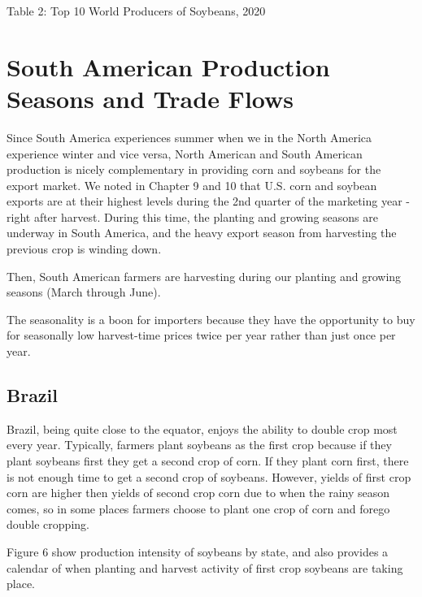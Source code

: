 \documentclass[
]{book}
\begin{document}
Table 2: Top 10 World Producers of Soybeans, 2020

\hypertarget{south-american-production-seasons-and-trade-flows}{%
\section{South American Production Seasons and Trade Flows}\label{south-american-production-seasons-and-trade-flows}}

Since South America experiences summer when we in the North America experience winter and vice versa, North American and South American production is nicely complementary in providing corn and soybeans for the export market. We noted in Chapter 9 and 10 that U.S. corn and soybean exports are at their highest levels during the 2nd quarter of the marketing year - right after harvest. During this time, the planting and growing seasons are underway in South America, and the heavy export season from harvesting the previous crop is winding down.

Then, South American farmers are harvesting during our planting and growing seasons (March through June).

The seasonality is a boon for importers because they have the opportunity to buy for seasonally low harvest-time prices twice per year rather than just once per year.

\hypertarget{brazil}{%
\subsection{Brazil}\label{brazil}}

Brazil, being quite close to the equator, enjoys the ability to double crop most every year. Typically, farmers plant soybeans as the first crop because if they plant soybeans first they get a second crop of corn. If they plant corn first, there is not enough time to get a second crop of soybeans. However, yields of first crop corn are higher then yields of second crop corn due to when the rainy season comes, so in some places farmers choose to plant one crop of corn and forego double cropping.

Figure 6 show production intensity of soybeans by state, and also provides a calendar of when planting and harvest activity of first crop soybeans are taking place.
\end{document}
